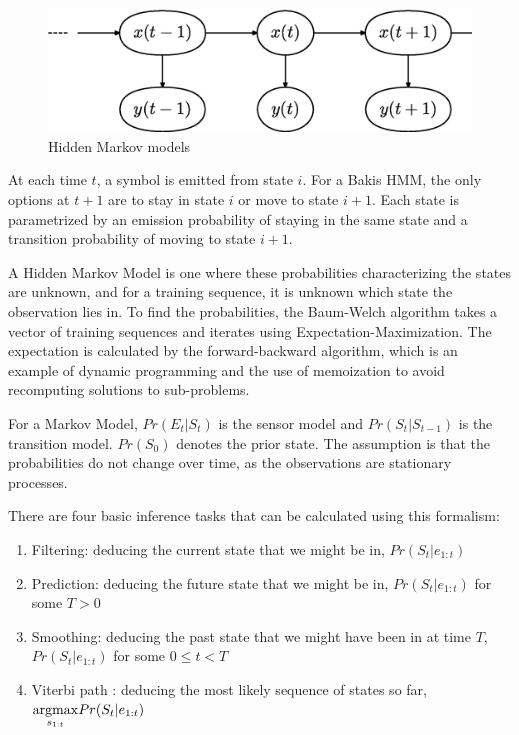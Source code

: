 \documentclass[12pt,a4,notitlepage]{report}
\renewcommand{\_}{\texttt{\symbol{95}}}
\newcommand{\<}{\texttt{\symbol{60}}}
\renewcommand{\>}{\texttt{\symbol{62}}}
\begin{document}
\begin{figure}
\centering
\includegraphics[scale=0.6,angle=0]{diagrams/markov.ps}
\caption{Hidden Markov models}
\label{hmm}
\end{figure}

At each time $t$, a symbol is emitted from state $i$. For a Bakis HMM, the only options at $t+1$ are to stay in state $i$ or move to state $i+1$\cite{Bakis}. Each state is parametrized by an emission probability of staying in the same state and a transition probability of moving to state $i+1$.

A Hidden Markov Model is one where these probabilities characterizing the states are unknown, and for a training sequence, it is unknown which state the observation lies in. To find the probabilities, the Baum-Welch algorithm takes a vector of training sequences and iterates using Expectation-Maximization. The expectation is calculated by the forward-backward algorithm, which is an example of dynamic programming and the use of memoization to avoid recomputing solutions to sub-problems.

For a Markov Model, $Pr(E_t|S_t)$ is the sensor model and $Pr(S_t|S_{t-1})$ is the transition model. $Pr(S_0)$ denotes the prior state. The assumption is that the probabilities do not change over time, as the observations are stationary processes.

There are four basic inference tasks that can be calculated using this formalism\cite{AIModern}:

\begin{enumerate}
\item Filtering: deducing the current state that we might be in, $Pr(S_t|e_{1:t})$
\item Prediction: deducing the future state that we might be in, $Pr(S_t|e_{1:t})$ for some $T>0$
\item Smoothing: deducing the past state that we might have been in at time $T$, $Pr(S_t|e_{1:t})$ for some $0 \le t < T$
\item Viterbi path : deducing the most likely sequence of states so far, $\underset{s_{1:t}}{\operatornamewithlimits{argmax}}Pr(S_t|e_{1:t})$
\end{enumerate}
\end{document}
